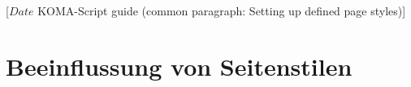 %
%
%
%
%
%
%
%
% 
%
%
%
%

                 [$Date$
                  KOMA-Script guide (common paragraph: 
                                     Setting up defined page styles)]

\section{Beeinflussung von Seitenstilen}
\BeginIndexGroup
{}

